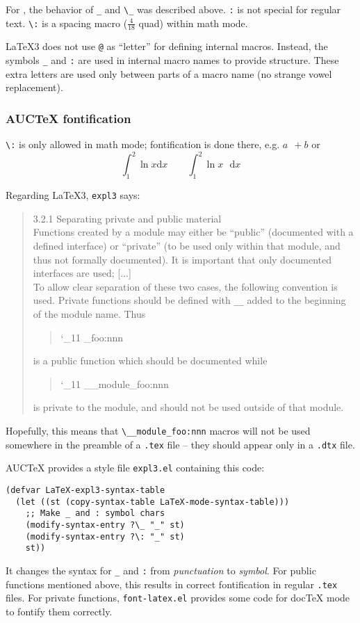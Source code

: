 \documentclass[a4paper]{article}
\begin{document}
For \LaTeXe, the behavior of \verb|_| and \verb|\_| was described
above.  \verb|:| is not special for regular text.  \verb|\:| is a
spacing macro ($\frac{4}{18}$ quad) within math mode.

\LaTeX3 does not use \verb|@| as ``letter'' for defining internal
macros.  Instead, the symbols \verb|_| and \verb|:| are used in
internal macro names to provide structure.  These extra letters are
used only between parts of a macro name (no strange vowel
replacement)\cite{expl3}.

\subsubsection{AUC\protect\TeX{} fontification}

\verb|\:| is only allowed in math mode; fontification is done there,
e.g. $a\:\:+b$ or
\begin{equation}
  \int_1^2 \ln x \mathrm{d}x
  \qquad
  \int_1^2 \ln x \:\:\:\mathrm{d}x
\end{equation}

Regarding \LaTeX3, \verb|expl3| says:
\begin{quote}
  3.2.1 Separating private and public material \\
  Functions created by a module may either be ``public'' (documented
  with a defined interface) or ``private'' (to be used only within
  that module, and thus not formally documented).  It is important
  that only documented interfaces are used; [...] \\
  To allow clear separation of these two cases, the following
  convention is used. Private functions should be defined with
  \verb|__| added to the beginning of the module name. Thus
  \begin{quote}
    \ttfamily \catcode`\_11\relax
    \string\module_foo:nnn
  \end{quote}
  is a public function which should be documented while
  \begin{quote}
    \ttfamily \catcode`\_11\relax
    \string\__module_foo:nnn
  \end{quote}
  is private to the module, and should not be used outside of that
  module.
\end{quote}
%
Hopefully, this means that \verb|\__module_foo:nnn| macros will not be
used somewhere in the preamble of a \verb|.tex| file -- they should
appear only in a \verb|.dtx| file.

AUC\TeX{} provides a style file \verb|expl3.el| containing this code:
\begin{verbatim}
(defvar LaTeX-expl3-syntax-table
  (let ((st (copy-syntax-table LaTeX-mode-syntax-table)))
    ;; Make _ and : symbol chars
    (modify-syntax-entry ?\_ "_" st)
    (modify-syntax-entry ?\: "_" st)
    st))
\end{verbatim}
It changes the syntax for \verb|_| and \verb|:| from
\textsl{punctuation} to \textsl{symbol}.  For public functions
mentioned above, this results in correct fontification in regular
\verb|.tex| files.  For private functions, \verb|font-latex.el|
provides some code for doc\TeX{} mode to fontify them correctly.
\end{document}
